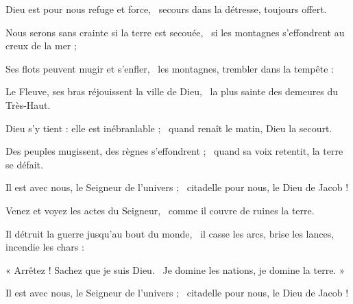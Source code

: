 \item Dieu est pour nous refuge et force,~\psstar{} secours dans la détresse, toujours offert.
\item Nous serons sans crainte si la terre est secouée,~\psstar{} si les montagnes s'effondrent au creux de la mer ;
\item Ses flots peuvent mugir et s'enfler,~\psstar{} les montagnes, trembler dans la tempête :
\item Le Fleuve, ses bras réjouissent la ville de Dieu,~\psstar{} la plus sainte des demeures du Très-Haut.
\item Dieu s'y tient : elle est inébranlable ;~\psstar{} quand renaît le matin, Dieu la secourt.
\item Des peuples mugissent, des règnes s'effondrent ;~\psstar{} quand sa voix retentit, la terre se défait.
\item Il est avec nous, le Seigneur de l'univers ;~\psstar{} citadelle pour nous, le Dieu de Jacob !
\item Venez et voyez les actes du Seigneur,~\psstar{} comme il couvre de ruines la terre.
\item Il détruit la guerre jusqu'au bout du monde,~\psstar{} il casse les arcs, brise les lances, incendie les chars :
\item « Arrêtez ! Sachez que je suis Dieu.~\psstar{} Je domine les nations, je domine la terre. »
\item Il est avec nous, le Seigneur de l'univers ;~\psstar{} citadelle pour nous, le Dieu de Jacob !
